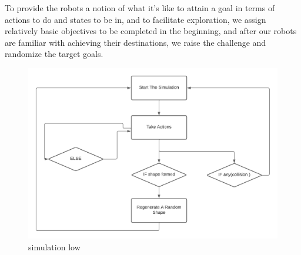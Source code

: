 \documentclass[12pt]{extarticle}
\begin{document}
To provide the robots a notion of what it's like to attain a goal in terms of actions to do and states to be in, and to facilitate exploration, we assign relatively basic objectives to be completed in the beginning, and after our robots are familiar with achieving their destinations, we raise the challenge and randomize the target goals.



 \begin{figure}[h]  
\centering
\includegraphics[scale=0.85]{simulation_flow}
\caption[simulation flow]{simulation low}
\end{figure}
\end{document}
